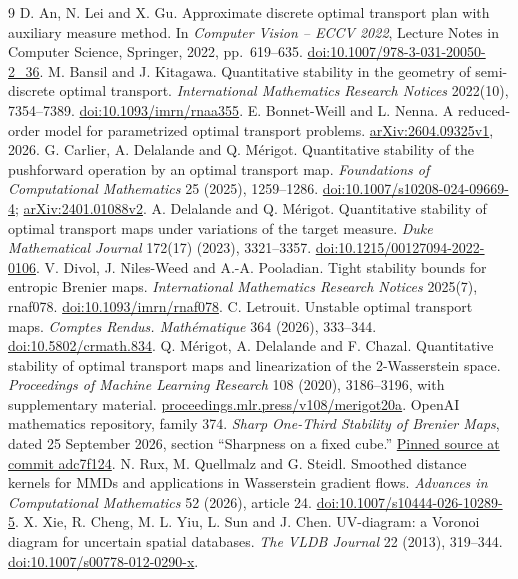 \documentclass[11pt]{article}
\theoremstyle{remark}
\begin{document}
\begin{thebibliography}{9}
 D. An, N. Lei and X. Gu.
Approximate discrete optimal transport plan with auxiliary measure method.
In \emph{Computer Vision -- ECCV 2022}, Lecture Notes in Computer Science, Springer, 2022, pp.~619--635.
\href{https://doi.org/10.1007/978-3-031-20050-2_36}{doi:10.1007/978-3-031-20050-2\_36}.
 M. Bansil and J. Kitagawa.
Quantitative stability in the geometry of semi-discrete optimal transport.
\emph{International Mathematics Research Notices} 2022(10), 7354--7389.
\href{https://doi.org/10.1093/imrn/rnaa355}{doi:10.1093/imrn/rnaa355}.
 E. Bonnet-Weill and L. Nenna.
A reduced-order model for parametrized optimal transport problems.
\href{https://arxiv.org/abs/2604.09325v1}{arXiv:2604.09325v1}, 2026.
 G. Carlier, A. Delalande and Q. M\'erigot.
Quantitative stability of the pushforward operation by an optimal transport map.
\emph{Foundations of Computational Mathematics} 25 (2025), 1259--1286.
\href{https://doi.org/10.1007/s10208-024-09669-4}{doi:10.1007/s10208-024-09669-4};
\href{https://arxiv.org/abs/2401.01088v2}{arXiv:2401.01088v2}.
 A. Delalande and Q. M\'erigot.
Quantitative stability of optimal transport maps under variations of the target measure.
\emph{Duke Mathematical Journal} 172(17) (2023), 3321--3357.
\href{https://doi.org/10.1215/00127094-2022-0106}{doi:10.1215/00127094-2022-0106}.
 V. Divol, J. Niles-Weed and A.-A. Pooladian.
Tight stability bounds for entropic Brenier maps.
\emph{International Mathematics Research Notices} 2025(7), rnaf078.
\href{https://doi.org/10.1093/imrn/rnaf078}{doi:10.1093/imrn/rnaf078}.
 C. Letrouit.
Unstable optimal transport maps.
\emph{Comptes Rendus. Math\'ematique} 364 (2026), 333--344.
\href{https://doi.org/10.5802/crmath.834}{doi:10.5802/crmath.834}.
 Q. M\'erigot, A. Delalande and F. Chazal.
Quantitative stability of optimal transport maps and linearization of the 2-Wasserstein space.
\emph{Proceedings of Machine Learning Research} 108 (2020), 3186--3196, with supplementary material.
\href{https://proceedings.mlr.press/v108/merigot20a.html}{proceedings.mlr.press/v108/merigot20a}.
 OpenAI mathematics repository, family 374.
\emph{Sharp One-Third Stability of Brenier Maps}, dated 25 September 2026,
section ``Sharpness on a fixed cube.''
\href{https://github.com/openai/math/tree/adc7f1241b42e322a6451854ab7e4b4c146bf78a/preprints/Sharp-One-Third-Stability-of-Brenier-Maps-September-25-2026}{Pinned source at commit adc7f124}.
 N. Rux, M. Quellmalz and G. Steidl.
Smoothed distance kernels for MMDs and applications in Wasserstein gradient flows.
\emph{Advances in Computational Mathematics} 52 (2026), article 24.
\href{https://doi.org/10.1007/s10444-026-10289-5}{doi:10.1007/s10444-026-10289-5}.
 X. Xie, R. Cheng, M. L. Yiu, L. Sun and J. Chen.
UV-diagram: a Voronoi diagram for uncertain spatial databases.
\emph{The VLDB Journal} 22 (2013), 319--344.
\href{https://doi.org/10.1007/s00778-012-0290-x}{doi:10.1007/s00778-012-0290-x}.
\end{thebibliography}
\end{document}
